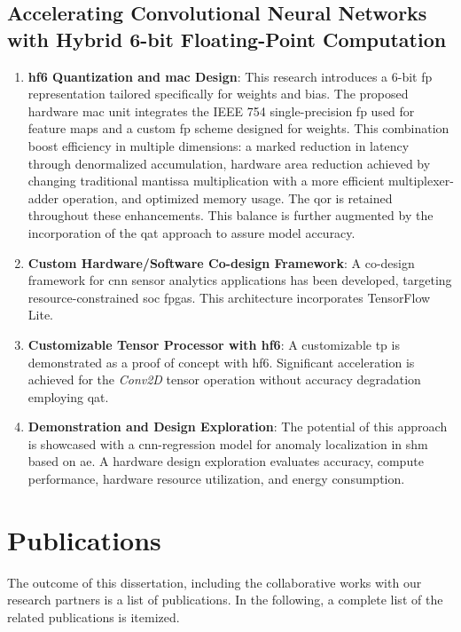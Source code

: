 \subsection{Accelerating Convolutional Neural Networks with Hybrid 6-bit Floating-Point Computation}
\begin{enumerate}
	\item \textbf{\gls{hf6} Quantization and \gls{mac} Design}:
	This research introduces a 6-bit \gls{fp} representation tailored specifically for weights and bias. The proposed hardware \gls{mac} unit integrates the IEEE 754 single-precision \gls{fp} used for feature maps and a custom \gls{fp} scheme designed for weights. This combination boost efficiency in multiple dimensions: a marked reduction in latency through denormalized accumulation, hardware area reduction achieved by changing traditional mantissa multiplication with a more efficient multiplexer-adder operation, and optimized memory usage. The \gls{qor} is retained throughout these enhancements. This balance is further augmented by the incorporation of the \gls{qat} approach to assure model accuracy.
	
	\item \textbf{Custom Hardware/Software Co-design Framework}: 
	A co-design framework for \gls{cnn} sensor analytics applications has been developed, targeting resource-constrained \gls{soc} \glspl{fpga}. This architecture incorporates TensorFlow Lite.
	
	\item \textbf{Customizable Tensor Processor with \gls{hf6}}: 
	A customizable \gls{tp} is demonstrated as a proof of concept with \gls{hf6}. Significant acceleration is achieved for the \emph{Conv2D} tensor operation without accuracy degradation employing \gls{qat}.
	
	\item \textbf{Demonstration and Design Exploration}: 
	The potential of this approach is showcased with a \gls{cnn}-regression model for anomaly localization in \gls{shm} based on \gls{ae}. A hardware design exploration evaluates accuracy, compute performance, hardware resource utilization, and energy consumption.
\end{enumerate}


\section{Publications}
The outcome of this dissertation, including the collaborative works with our research partners is a list of publications. In the following, a complete list of the related publications is itemized.

